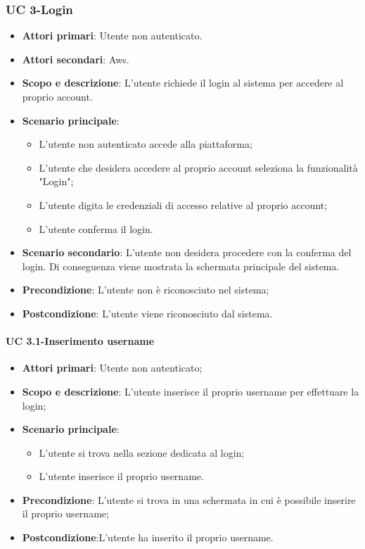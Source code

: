       \subsubsection{UC 3-Login}
        \begin{itemize}
        \item \textbf{Attori primari}: Utente non autenticato.
        \item \textbf{Attori secondari}: Aws.
        \item \textbf{Scopo e descrizione}: L'utente richiede il login al sistema per accedere al proprio account.
        \item \textbf{Scenario principale}:
            \begin{itemize}
                \item L'utente non autenticato accede alla piattaforma;
                \item L'utente che desidera accedere al proprio account seleziona la funzionalità "Login";
                \item L'utente digita le credenziali di accesso relative al proprio account;
                \item L'utente conferma il login.
            \end{itemize}
         \item \textbf{Scenario secondario}: L'utente non desidera procedere con la conferma del login. Di conseguenza viene mostrata la schermata principale del sistema.
         
        \item \textbf{Precondizione}: L'utente non è riconosciuto nel sistema;
        \item \textbf{Postcondizione}: L'utente viene riconosciuto dal sistema.
        \end{itemize}

   
        \paragraph{UC 3.1-Inserimento username}
            \begin{itemize}
                \item \textbf{Attori primari}: Utente non autenticato;
                
                \item \textbf{Scopo e descrizione}: L'utente inserisce il proprio username per effettuare la login; 
                \item \textbf{Scenario principale}: 
                    \begin{itemize}
                        \item L'utente si trova nella sezione dedicata al login;
                        \item L'utente inserisce il proprio username.
                    \end{itemize}
                \item \textbf{Precondizione}: L'utente si trova in una schermata in cui è possibile inserire il proprio username;
             \item \textbf{Postcondizione}:L'utente ha inserito il proprio username.
           \end{itemize}
        
